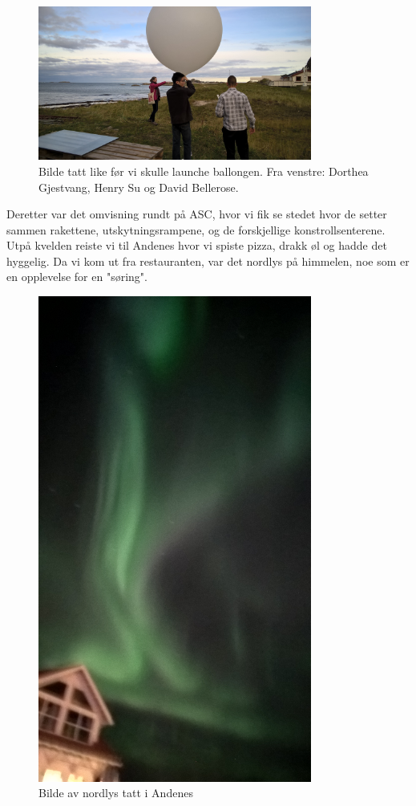\documentclass[norsk,a4paper,12pt]{article}
\begin{document}
\begin{figure}[H]
\centering
\includegraphics[width=90mm]{balloon.jpg}
\caption{Bilde tatt like f{\o}r vi skulle launche ballongen. Fra venstre: Dorthea Gjestvang, Henry Su og David Bellerose. \label{overflow}}
\end{figure}
Deretter var det omvisning rundt p{\aa} ASC, hvor vi fik se stedet hvor de setter sammen rakettene, utskytningsrampene, og de forskjellige konstrollsenterene. Utp{\aa} kvelden reiste vi til Andenes hvor vi spiste pizza, drakk {\o}l og hadde det hyggelig. Da vi kom ut fra restauranten, var det nordlys p{\aa} himmelen, noe som er en opplevelse for en "s{\o}ring". 
\begin{figure}[H]
\centering
\includegraphics[width=90mm]{northernlights.jpg}
\caption{Bilde av nordlys tatt i Andenes \label{overflow}}
\end{figure}
\end{document}

